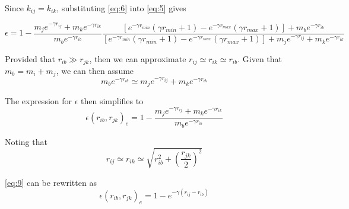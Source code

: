 \documentclass{article}
\begin{document}
Since $k_{ij} = k_{ik}$, substituting \eqref{eq:6} into \eqref{eq:5} gives

\begin{equation}\label{eq:7}
\epsilon = 1 - \frac{ m_j e^{-\gamma r_{ij}} + m_k e^{-\gamma r_{ik}}}{m_b e^{-\gamma r_{ib}}} 
\frac{ \left[e^{-\gamma r_{min}} \left( \gamma r_{min} +1 \right) - e^{-\gamma r_{max}} \left( \gamma r_{max} +1 \right) \right] + m_b e^{-\gamma r_{ib}}} { \left[e^{-\gamma r_{min}} \left( \gamma r_{min} +1 \right) - e^{-\gamma r_{max}} \left( \gamma r_{max} +1 \right) \right] + m_j e^{-\gamma r_{ij}} + m_k e^{-\gamma r_{ik}}}  
\end{equation}

Provided that $r_{ib} \gg r_{jk}$, then we can approximate $r_{ij} \simeq r_{ik} \simeq r_{ib}$. Given that $ m_b = m_i + m_j$, we can then assume 
\begin{equation}\label{eq:8}
m_b e^{-\gamma r_{ib}} \simeq m_j e^{-\gamma r_{ij}} + m_k e^{-\gamma r_{ik}}
\end{equation}

The expression for $\epsilon$ then simplifies to
\begin{equation}\label{eq:9}
\epsilon \left( r_{ib}, r_{jk} \right)_{e} = 1 - \frac{m_j e^{-\gamma r_{ij}} + m_k e^{-\gamma r_{ik}}}{m_b e^{- \gamma r_{ib}}}
\end{equation}

Noting that
\begin{equation}\label{eq:10}
r_{ij} \simeq r_{ik} \simeq \sqrt{r_{ib}^2 + \left(\frac{r_{jk}}{2}\right)^2}
\end{equation}

\eqref{eq:9} can be rewritten as
\begin{equation}\label{eq:11}
\epsilon \left( r_{ib}, r_{jk} \right)_{e} = 1 - e^{-\gamma \left( r_{ij} - r_{ib}\right)} 
\end{equation}


\end{document}
